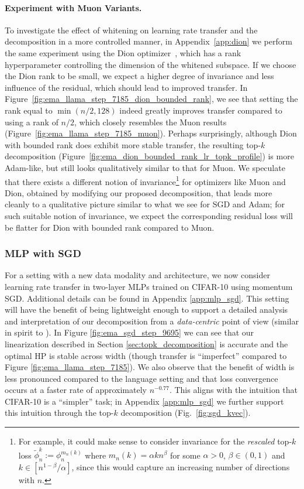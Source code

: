\paragraph{Experiment with Muon Variants.} 
To investigate the effect of whitening on learning rate transfer and the decomposition in a more controlled manner, in Appendix~\ref{app:dion} we perform the same experiment using the Dion optimizer~\citep{ahn2025dion}, which has a rank hyperparameter controlling the dimension of the whitened subspace. If we choose the Dion rank to be small, we expect a higher degree of invariance and less influence of the residual, which should lead to improved transfer. In Figure~\ref{fig:ema_llama_step_7185_dion_bounded_rank}, we see that setting the rank equal to $\min(n/2, 128)$ indeed greatly improves transfer compared to using a rank of $n/2$, which closely resembles the Muon results (Figure~\ref{fig:ema_llama_step_7185_muon}). Perhaps surprisingly, although Dion with bounded rank does exhibit more stable transfer, the resulting top-$k$ decomposition (Figure~\ref{fig:ema_dion_bounded_rank_lr_topk_profile}) is more Adam-like, but still looks qualitatively similar to that for Muon. We speculate that there exists a different notion of invariance\footnote{For example, it could make sense to consider invariance for the \emph{rescaled} top-$k$ loss $\tilde{\phi}_n^k := \phi_{n}^{m_n(k)}$ where $m_n(k) = \alpha k n^{\beta}$ for some $\alpha > 0$, $\beta \in (0, 1)$ and $k \in [n^{1-\beta} / \alpha]$, since this would capture an increasing number of directions with $n$. \vspace{-3.5mm} } for optimizers like Muon and Dion, obtained by modifying our proposed decomposition, that leads more cleanly to a qualitative picture similar to what we see for SGD and Adam; for such suitable notion of invariance, we expect the corresponding residual loss will be flatter for Dion with bounded rank compared to Muon. 

\subsubsection{MLP with SGD}\label{sec:mlp_sgd}
For a setting with a new data modality and architecture, we now consider learning rate transfer in two-layer MLPs trained on CIFAR-10 using momentum SGD. Additional details can be found in Appendix \ref{app:mlp_sgd}. 
This setting will have the benefit of being lightweight enough to support a detailed analysis and interpretation of our decomposition from a \textit{data-centric} point of view (similar in spirit to \citet{zhong2021larger,kaplun2022deconstructing,ilyas2022datamodels}). 
In Figure \ref{fig:ema_sgd_step_9695} we can see that our linearization described in Section \ref{sec:topk_decomposition} is accurate and the optimal HP is stable across width (though transfer is ``imperfect'' compared to Figure \ref{fig:ema_llama_step_7185}). 
We also observe that the benefit of width is less pronounced compared to the language setting and that loss convergence occurs at a faster rate of approximately $n^{-0.77}$. This aligns with the intuition that CIFAR-10 is a ``simpler'' task; in Appendix \ref{app:mlp_sgd} we further support this intuition through the top-$k$ decomposition (Fig.~\ref{fig:sgd_kvec}). 

